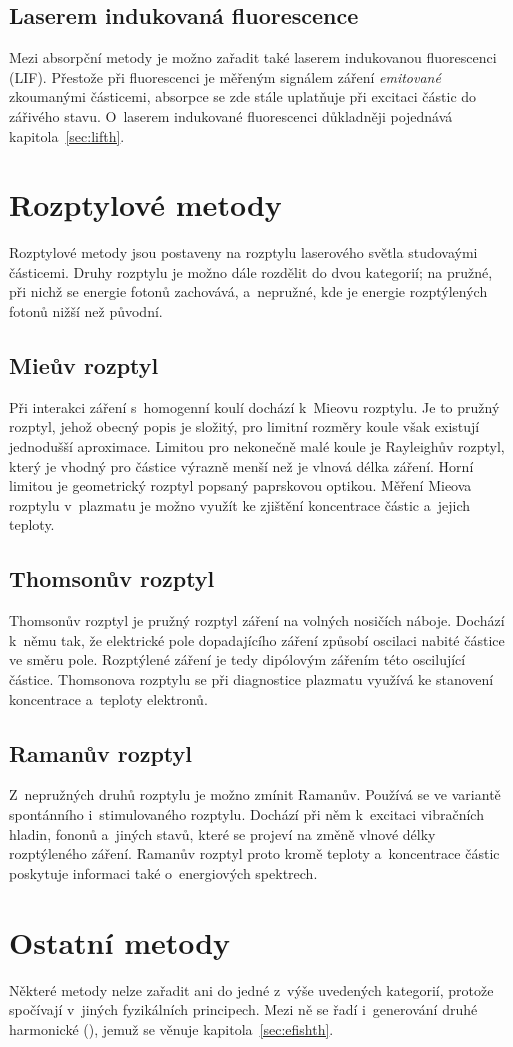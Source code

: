\subsection{Laserem indukovaná fluorescence}
\label{sec:diagnostics-lif}
Mezi absorpční metody je možno zařadit také laserem indukovanou fluorescenci
(LIF).
Přestože při fluorescenci je měřeným signálem záření \emph{emitované}
zkoumanými částicemi, absorpce se zde stále uplatňuje při excitaci částic
do zářivého stavu.
O~laserem indukované fluorescenci důkladněji pojednává
kapitola~\ref{sec:lifth}.

\section{Rozptylové metody}
\label{sec:diagnostics-scattering}
Rozptylové metody jsou postaveny na rozptylu laserového světla
studovaými částicemi.
Druhy rozptylu je možno dále rozdělit do dvou kategorií;
na pružné, při nichž se energie fotonů zachovává,
a~nepružné, kde je energie rozptýlených fotonů nižší než původní.

\subsection{Mieův rozptyl}
\label{sec:diagnostics-mie}
Při interakci záření s~homogenní koulí dochází k~Mieovu rozptylu.
Je to pružný rozptyl, jehož obecný popis je složitý,
pro limitní rozměry koule však existují jednodušší aproximace.
Limitou pro nekonečně malé koule je Rayleighův rozptyl,
který je vhodný pro částice výrazně menší než je vlnová délka záření.
Horní limitou je geometrický rozptyl popsaný paprskovou optikou.
Měření Mieova rozptylu v~plazmatu je možno využít ke zjištění
koncentrace částic a~jejich teploty.
\autocite{wiki-mie}

\subsection{Thomsonův rozptyl}
\label{sec:diagnostics-thomson}
Thomsonův rozptyl je pružný rozptyl záření na volných nosičích náboje.
Dochází k~němu tak, že elektrické pole dopadajícího záření způsobí
oscilaci nabité částice ve směru pole.
Rozptýlené záření je tedy dipólovým zářením této oscilující částice.
Thomsonova rozptylu se při diagnostice plazmatu
využívá ke stanovení koncentrace a~teploty elektronů.
\autocite{wiki-thomson}

\subsection{Ramanův rozptyl}
\label{sec:diagnostics-raman}
Z~nepružných druhů rozptylu je možno zmínit Ramanův.
Používá se ve variantě spontánního i~stimulovaného rozptylu.
Dochází při něm k~excitaci vibračních hladin, fononů a~jiných stavů,
které se projeví na změně vlnové délky rozptýleného záření.
Ramanův rozptyl proto kromě teploty a~koncentrace částic
poskytuje informaci také o~energiových spektrech.

\section{Ostatní metody}
\label{sec:diagnostics-misc}
Některé metody nelze zařadit ani do jedné z~výše uvedených kategorií,
protože spočívají v~jiných fyzikálních principech.
Mezi ně se řadí i~generování druhé harmonické (\EFISH),
jemuž se věnuje kapitola~\ref{sec:efishth}.
